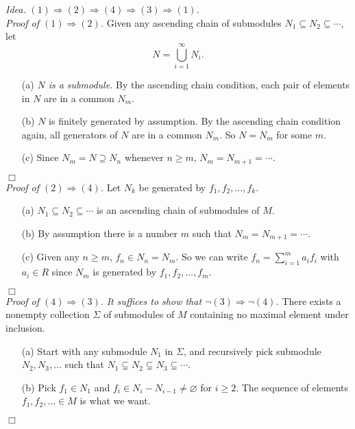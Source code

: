 \documentclass{article}
\begin{document}
\emph{Idea.}
$(1) \Rightarrow (2) \Rightarrow (4) \Rightarrow (3) \Rightarrow (1)$. \\

\emph{Proof of $(1) \Rightarrow (2)$.}
Given any ascending chain of submodules $N_1 \subseteq N_2 \subseteq \cdots$,
let $$N = \bigcup_{i=1}^{\infty} N_i.$$
\begin{enumerate}
\item[(a)]
\emph{$N$ is a submodule.}
By the ascending chain condition, each pair of elements in $N$ are in a common $N_m$.
\item[(b)]
$N$ is finitely generated by assumption.
By the ascending chain condition again, all generators of $N$ are in a common $N_m$.
So $N = N_m$ for some $m$.
\item[(c)]
Since $N_m = N \supseteq N_n$ whenever $n \geq m$,
$N_m = N_{m+1} = \cdots$.
\end{enumerate}
$\Box$ \\

\emph{Proof of $(2) \Rightarrow (4)$.}
Let $N_k$ be generated by $f_1, f_2, \ldots, f_k$.
\begin{enumerate}
\item[(a)]
$N_1 \subseteq N_2 \subseteq \cdots$ is an ascending chain of submodules of $M$.
\item[(b)]
By assumption there is a number $m$ such that $N_m = N_{m+1} = \cdots$.
\item[(c)]
Given any $n \geq m$, $f_n \in N_n = N_m$.
So we can write $f_n = \sum_{i=1}^{m} a_i f_i$ with $a_i \in R$
since $N_m$ is generated by $f_1, f_2, \ldots, f_m$.
\end{enumerate}
$\Box$ \\

\emph{Proof of $(4) \Rightarrow (3)$.}
\emph{It suffices to show that $\neg (3) \Rightarrow \neg (4)$.}
There exists a nonempty collection
$\Sigma$ of submodules of $M$ containing no maximal element under inclusion.
\begin{enumerate}
\item[(a)]
Start with any submodule $N_1$ in $\Sigma$,
and recursively pick submodule $N_2, N_3, \ldots$ such that
$N_1 \subsetneq N_2 \subsetneq N_3 \subsetneq \cdots$.
\item[(b)]
Pick $f_1 \in N_1$ and $f_i \in N_i - N_{i-1} \neq \varnothing$ for $i \geq 2$.
The sequence of elements $f_1, f_2, \ldots \in M$ is what we want.
\end{enumerate}
$\Box$ \\
\end{document}
